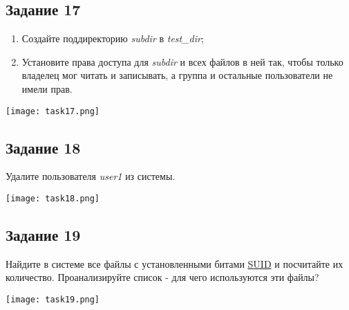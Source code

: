 \documentclass[12pt, a4paper]{report}
\begin{document}
	\subsection*{Задание 17}
	\begin{enumerate}
		\item Создайте поддиректорию \textit{subdir} в \textit{test\_dir};
		\item Установите права доступа для \textit{subdir} и всех файлов в ней так, чтобы только владелец мог читать и записывать, а группа и остальные пользователи не имели прав.
	\end{enumerate}
	\lstset{style=mystyle}
	
	\begin{center}
		\texttt{[image: task17.png]}
	\end{center}

	\subsection*{Задание 18}
	Удалите пользователя \textit{user1} из системы.
	\lstset{style=mystyle}
	
	\begin{center}
		\texttt{[image: task18.png]}
	\end{center}

	\subsection*{Задание 19}
	Найдите в системе все файлы с установленными битами \underline{SUID} и посчитайте их количество. Проанализируйте список - для чего используются эти файлы?
	\lstset{style=mystyle}
	
	\begin{center}
		\texttt{[image: task19.png]}
	\end{center}
\end{document}
